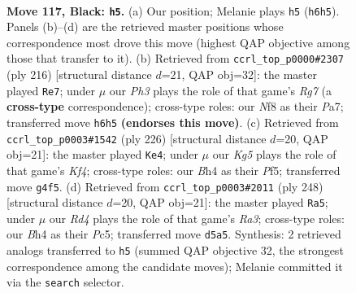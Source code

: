 \documentclass[11pt]{article}
\begin{document}
\clearpage

\begin{figure}[p]\centering
\begin{subfigure}{0.46\textwidth}\centering
\resizebox{\linewidth}{!}{%
\newchessgame
\chessboard[
  setfen={1R3n2/8/7p/3rp3/6kb/8/2Kp4/8 b - - 5 117},
  showmover=false,
  pgfstyle=straightmove, color=movearrow, markmove={h6-h5}
]}
\caption{}
\end{subfigure}\hfill
\begin{subfigure}{0.46\textwidth}\centering
\resizebox{\linewidth}{!}{%
\newchessgame
\chessboard[
  setfen={8/P5R1/r7/8/2k5/2P5/2K5/8 w - - 9 109},
  showmover=false,
  pgfstyle=straightmove, color=movearrow, markmove={g7-e7}
]}
\caption{}
\end{subfigure}
\\[4pt]
\begin{subfigure}{0.46\textwidth}\centering
\resizebox{\linewidth}{!}{%
\newchessgame
\chessboard[
  setfen={8/7k/7P/5P2/5K2/7R/8/1r6 w - - 79 114},
  showmover=false,
  pgfstyle=straightmove, color=movearrow, markmove={f4-e4}
]}
\caption{}
\end{subfigure}\hfill
\begin{subfigure}{0.46\textwidth}\centering
\resizebox{\linewidth}{!}{%
\newchessgame
\chessboard[
  setfen={8/k7/P7/2P5/3K4/R7/7r/8 w - - 73 125},
  showmover=false,
  pgfstyle=straightmove, color=movearrow, markmove={a3-a5}
]}
\caption{}
\end{subfigure}
\caption{\textbf{Move 117, Black: \texttt{h5}.} (a) Our position; Melanie plays \texttt{h5} (\texttt{h6h5}). Panels (b)--(d) are the retrieved master positions whose correspondence most drove this move (highest QAP objective among those that transfer to it). (b) Retrieved from \texttt{ccrl\_top\_p0000\#2307} (ply 216) [structural distance $d$=21, QAP obj=32]: the master played \texttt{Re7}; under $\mu$ our \emph{Ph3} plays the role of that game's \emph{Rg7} (a \textbf{cross-type} correspondence); cross-type roles: our \emph{N}f8 as their \emph{P}a7; transferred move \texttt{h6h5} \textbf{(endorses this move)}. (c) Retrieved from \texttt{ccrl\_top\_p0003\#1542} (ply 226) [structural distance $d$=20, QAP obj=21]: the master played \texttt{Ke4}; under $\mu$ our \emph{Kg5} plays the role of that game's \emph{Kf4}; cross-type roles: our \emph{B}h4 as their \emph{P}f5; transferred move \texttt{g4f5}. (d) Retrieved from \texttt{ccrl\_top\_p0003\#2011} (ply 248) [structural distance $d$=20, QAP obj=21]: the master played \texttt{Ra5}; under $\mu$ our \emph{Rd4} plays the role of that game's \emph{Ra3}; cross-type roles: our \emph{B}h4 as their \emph{P}c5; transferred move \texttt{d5a5}. Synthesis: 2 retrieved analogs transferred to \texttt{h5} (summed QAP objective 32, the strongest correspondence among the candidate moves); Melanie committed it via the \texttt{search} selector.}
\label{fig:thought-m233}
\end{figure}
\end{document}

